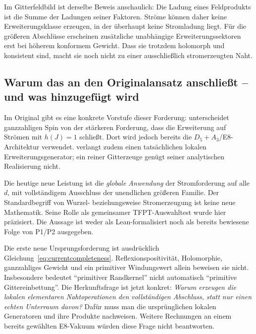 Im Gitterfeldbild ist derselbe Beweis anschaulich: Die Ladung eines Feldprodukts ist die Summe der Ladungen seiner Faktoren. Ströme können daher keine Erweiterungsklasse erzeugen, in der überhaupt keine Stromladung liegt. Für die größeren Abschlüsse erscheinen zusätzliche unabhängige Erweiterungssektoren erst bei höherem konformem Gewicht. Dass sie trotzdem holomorph und konsistent sind, macht sie noch nicht zu einer ausschließlich stromerzeugten Naht.


\subsection{Warum das an den Originalansatz anschließt -- und was hinzugefügt wird}

Im Original gibt es eine konkrete Vorstufe dieser Forderung:  unterscheidet ganzzahligen Spin von der stärkeren Forderung, dass die Erweiterung auf Strömen mit $h(J)=1$ schließt. Dort wird jedoch bereits die $D_5+A_3$/E8-Architektur verwendet.  verlangt zudem einen tatsächlichen lokalen Erweiterungsgenerator; ein reiner Gitterzeuge genügt seiner analytischen Realisierung nicht.

Die heutige neue Leistung ist die \emph{globale Anwendung} der Stromforderung auf alle $d$, mit vollständigem Ausschluss der unendlichen größeren Familie. Der Standardbegriff von Wurzel- beziehungsweise Stromerzeugung ist keine neue Mathematik. Seine Rolle als gemeinsamer TFPT-Auswahltest wurde hier präzisiert. Die Aussage ist weder als Lean-formalisiert noch als bereits bewiesene Folge von P1/P2 ausgegeben.

Die erste neue Ursprungsforderung ist ausdrücklich Gleichung~\eqref{eq:currentcompleteness}. Reflexionspositivität, Holomorphie, ganzzahliges Gewicht und ein primitiver Windungswert allein beweisen sie nicht. Insbesondere bedeutet ``primitiver Randkernel'' nicht automatisch ``primitive Gittereinbettung''. Die Herkunftsfrage ist jetzt konkret: \emph{Warum erzeugen die lokalen elementaren Nahtoperationen den vollständigen Abschluss, statt nur einen echten Unterraum davon?} Dafür muss man die ursprünglichen lokalen Generatoren und ihre Produkte nachweisen. Weitere Rechnungen an einem bereits gewählten E8-Vakuum würden diese Frage nicht beantworten.

